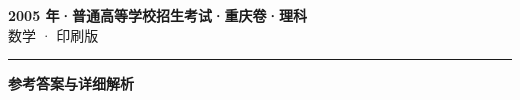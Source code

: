 \documentclass[zihao=5, a4paper]{ctexart}
\begin{document}
\begin{center}
  {\Large\bfseries 2005 年·普通高等学校招生考试·重庆卷·理科}\\[4pt]
  {\large 数学 · 印刷版}
\end{center}
\medskip
{}

\par\bigskip\hrule\bigskip
{}
\begin{center}{\large\bfseries 参考答案与详细解析}\end{center}
\smallskip

\end{document}
